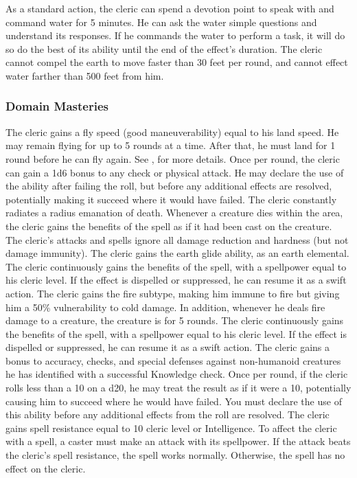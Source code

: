 As a standard action, the cleric can spend a devotion point to speak with and command water for 5 minutes.
He can ask the water simple questions and understand its responses.
If he commands the water to perform a task, it will do so do the best of its ability until the end of the effect's duration.
The cleric cannot compel the earth to move faster than 30 feet per round, and cannot effect water farther than 500 feet from him.

\subsubsection{Domain Masteries}\label{Domain Masteries}

The cleric gains a fly speed (good maneuverability) equal to his land speed.
He may remain flying for up to 5 rounds at a time.
After that, he must land for 1 round before he can fly again.
See , for more details.
Once per round, the cleric can gain a \plus1d6 bonus to any check or physical attack.
He may declare the use of the ability after failing the roll, but before any additional effects are resolved, potentially making it succeed where it would have failed.
The cleric constantly radiates a \areamed radius emanation of death.
Whenever a creature dies within the area, the cleric gains the benefits of the  spell as if it had been cast on the creature.
The cleric's attacks and spells ignore all damage reduction and hardness (but not damage immunity).
The cleric gains the earth glide ability, as an earth elemental.
 The cleric continuously gains the benefits of the 
spell, with a spellpower equal to his cleric level.
If the effect is dispelled or suppressed, he can resume it as a swift action.
The cleric gains the fire subtype, making him immune to fire but giving him a 50\% vulnerability to cold damage.
In addition, whenever he deals fire damage to a creature, the creature is \ignited for 5 rounds.
 The cleric continuously gains the benefits of the 
spell, with a spellpower equal to his cleric level.
If the effect is dispelled or suppressed, he can resume it as a swift action.
The cleric gains a  bonus to accuracy, checks, and special defenses against non-humanoid creatures he has identified with a successful Knowledge check.
Once per round, if the cleric rolls less than a 10 on a d20, he may treat the result as if it were a 10, potentially causing him to succeed where he would have failed.
You must declare the use of this ability before any additional effects from the roll are resolved.
The cleric gains spell resistance equal to 10 \add cleric level or Intelligence.
To affect the cleric with a spell, a caster must make an attack with its spellpower.
If the attack beats the cleric's spell resistance, the spell works normally.
Otherwise, the spell has no effect on the cleric.

